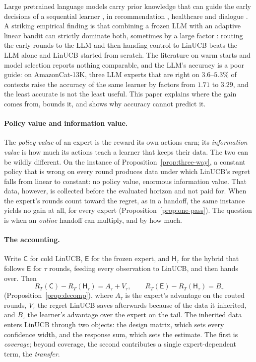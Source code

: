 \documentclass{article}
\theoremstyle{definition}
\theoremstyle{remark}
\theoremstyle{remark}
\newcommand{\Cold}{\mathsf{C}}
\newcommand{\Exp}{\mathsf{E}}
\newcommand{\Hyb}{\mathsf{H}}
\begin{document}
Large pretrained language models carry prior knowledge that can guide the
early decisions of a sequential learner
\cite{brown2020language,ouyang2022training,achiam2023gpt,alamdari2024jumpstarting,abbasiyadkori2024believe},
in recommendation \cite{li2010contextual,agarwal2016making}, healthcare
\cite{tewari2017ads,svensson2023sequential} and dialogue \cite{li2016deep}.
A striking empirical finding is that combining a frozen LLM with an adaptive
linear bandit can strictly dominate both, sometimes by a large factor
\cite{chen2024llmdecision,huangcontextual}: routing the early rounds to the
LLM and then handing control to LinUCB beats the LLM alone and LinUCB started
from scratch. The literature on warm starts and model selection
\cite{bastani2021mostly,zhang2019warm,agarwal2017corralling} reports nothing
comparable, and the LLM's accuracy is a poor guide: on AmazonCat-13K, three
LLM experts that are right on $3.6$--$5.3\%$ of contexts raise the accuracy of
the same learner by factors from $1.71$ to $3.29$, and the least accurate is
not the least useful. This paper explains where the gain comes from, bounds
it, and shows why accuracy cannot predict it.

\paragraph{Policy value and information value.}
The \emph{policy value} of an expert is the reward its own actions earn; its
\emph{information value} is how much its actions teach a learner that keeps
their data. The two can be wildly different. On the instance of
Proposition~\ref{prop:three-way}, a constant policy that is wrong on every
round produces data under which LinUCB's regret falls from linear to
constant: no policy value, enormous information value. That data, however, is
collected before the evaluated horizon and not paid for. When the expert's
rounds count toward the regret, as in a handoff, the same instance yields no
gain at all, for every expert (Proposition~\ref{prop:one-pass}). The question
is when an \emph{online} handoff can multiply, and by how much.

\paragraph{The accounting.}
Write $\Cold$ for cold LinUCB, $\Exp$ for the frozen expert, and $\Hyb_\tau$
for the hybrid that follows $\Exp$ for $\tau$ rounds, feeding every
observation to LinUCB, and then hands over. Then
\[
R_T(\Cold)-R_T(\Hyb_\tau)=A_\tau+V_\tau,\qquad R_T(\Exp)-R_T(\Hyb_\tau)=B_\tau
\]
(Proposition~\ref{prop:decomp}), where $A_\tau$ is the expert's advantage on
the routed rounds, $V_\tau$ the regret LinUCB saves afterwards because of the
data it inherited, and $B_\tau$ the learner's advantage over the expert on
the tail. The inherited data enters LinUCB through two objects: the design
matrix, which sets every confidence width, and the response sum, which sets
the estimate. The first is \emph{coverage}; beyond coverage, the second
contributes a single expert-dependent term, the \emph{transfer}.
\end{document}
